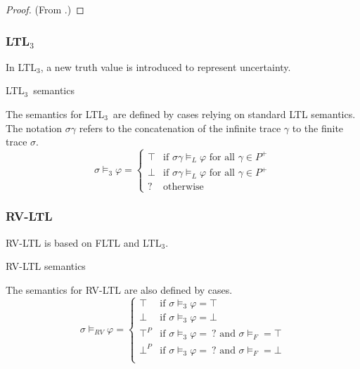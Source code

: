 \documentclass[a4paper]{article}
\newcommand{\tand}{\text{ and }}
\newcommand{\fall}{\text{ for all }}
\newcommand{\ltlt}{LTL$_3$}
\begin{document}
\begin{proof}
  (From \autocite{bauer2010comparing}.)
\end{proof}

\subsubsection{\ltlt} In \ltlt, a new truth value is introduced to represent uncertainty.
\begin{defn}{\ltlt\ semantics}

  The semantics for \ltlt\ are defined by cases relying on standard LTL semantics. The notation $\sigma\gamma$ refers to the concatenation of the infinite trace $\gamma$ to the finite trace $\sigma$.
  \[\sigma\vDash_3\varphi =
    \begin{cases}
      \top & \text{if } \sigma\gamma \vDash_L \varphi \fall \gamma \in P^+\\
      \bot & \text{if } \sigma\gamma \vDash_L \varphi \fall \gamma \in P^+\\
      ? & \text{otherwise}
    \end{cases}
    \]
\end{defn}

\subsubsection{RV-LTL} RV-LTL is based on FLTL and \ltlt.
\begin{defn}{RV-LTL semantics}

  The semantics for RV-LTL are also defined by cases.
  \[\sigma\vDash_{RV}\varphi =
    \begin{cases}
      \top & \text{if } \sigma \vDash_3 \varphi = \top\\
      \bot & \text{if } \sigma \vDash_3 \varphi = \bot\\
      \top^P & \text{if } \sigma \vDash_3 \varphi = ~?\tand \sigma\vDash_F = \top \\
      \bot^P & \text{if } \sigma \vDash_3 \varphi = ~?\tand \sigma\vDash_F = \bot \\

    \end{cases}
  \]
\end{defn}
\end{document}
